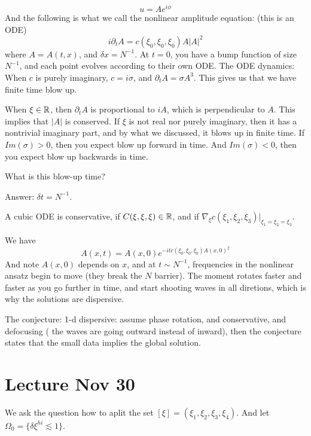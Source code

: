 \begin{equation*}
    u=Ae^{i\phi}
\end{equation*}
And the following is what we call the nonlinear amplitude equation: (this is an ODE)
\begin{equation*}
    i\partial_t A=c(\xi_0,\xi_0, \xi_0)A|A|^2
\end{equation*}
where $A=A(t,x)$, and $\delta x=N^{-1}$. At $t=0$, you have a bump function of size $N^{-1}$, and each point evolves according to their own ODE. The ODE dynamics: When $c$ is purely imaginary, $c=i\sigma$, and $\partial_tA=\sigma A^3$. This gives us that we have finite time blow up.

When $\xi\in\mathbb{R}$, then $\partial_tA$  is proportional to $iA$, which is perpendicular to $A$. This implies that $|A|$ is conserved. If $\xi$ is not real nor purely imaginary, then it has a nontrivial imaginary part, and by what we discussed, it blows up in finite time. If $Im(\sigma)>0$, then you expect blow up forward in time. And $Im(\sigma)<0$, then you expect blow up backwards in time.
\begin{problem}
    What is this blow-up time?
\end{problem}
Answer: $\delta t=N^{-1}$.

\begin{definition}
    A cubic ODE is conservative, if $C(\xi,\xi,\xi)\in\mathbb{R}$, and if $\nabla_\xi c(\xi_1,\xi_2,\xi_3)\vert_{\xi_1=\xi_2=\xi_3}$.
\end{definition}
We have 
\begin{equation*}
    A(x,t)=A(x,0)e^{-itc(\xi_0,\xi_0,\xi_0)A(x,0)^2}
\end{equation*}
And note $A(x,0)$ depends on $x$, and at $t\sim N^{-1}$, frequencies in the nonlinear ansatz begin to move (they break the $N$ barrier). The moment rotates faster and faster as you go further in time, and start shooting waves in all diretions, which is why the solutions are dispersive.

The conjecture:
1-d dispersive: assume phase rotation, and conservative, and defocusing ( the waves are going outward instead of inward), then the conjecture states that the small data implies the global solution.


\section{Lecture Nov 30}
We ask the question how to aplit the set $[\xi]=(\xi_1, \xi_2, \xi_3, \xi_4)$. And let $\Omega_0=\{\delta\xi^{hi}\lesssim 1\}$.

